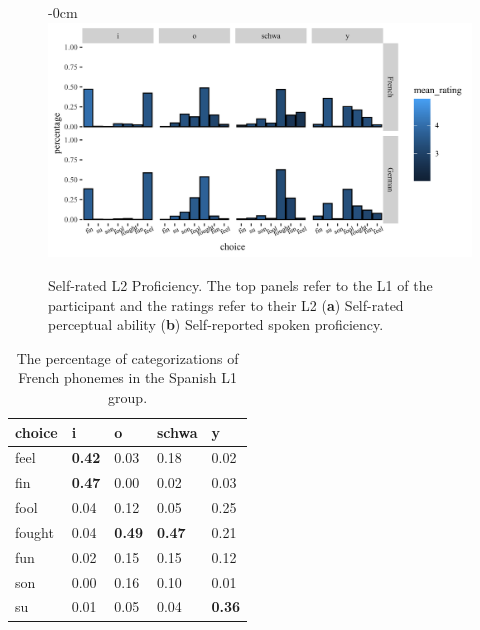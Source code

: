 \documentclass[preprints]{Definitions/mdpi}
\begin{document}
\begin{figure}[H]
\begin{adjustwidth}{-\extralength}{0cm}
\centering
\includegraphics[width=13.5cm]{figs/span_desc_plot.png}
\end{adjustwidth}
\caption{Self-rated L2 Proficiency. The top panels refer to the L1 of the participant and the ratings refer to their L2 (\textbf{a}) Self-rated perceptual ability (\textbf{b}) Self-reported spoken proficiency.\label{span_desc}}
\end{figure}

\begin{table}[H] 
\caption{The percentage of categorizations of French phonemes in the Spanish L1 group.\label{sl1_fr}}
\begin{tabularx}{\textwidth}{CCCCC}
\toprule
choice & i & o & schwa & y \\ 
  \hline
feel & \textbf{0.42} & 0.03 & 0.18 & 0.02 \\ 
fin & \textbf{0.47} & 0.00 & 0.02 & 0.03 \\ 
fool & 0.04 & 0.12 & 0.05 & 0.25 \\ 
fought & 0.04 & \textbf{0.49} & \textbf{0.47} & 0.21 \\ 
fun & 0.02 & 0.15 & 0.15 & 0.12 \\ 
son & 0.00 & 0.16 & 0.10 & 0.01 \\ 
su & 0.01 & 0.05 & 0.04 & \textbf{0.36} \\ 

\bottomrule
\end{tabularx}
\end{table}
\unskip
\end{document}
